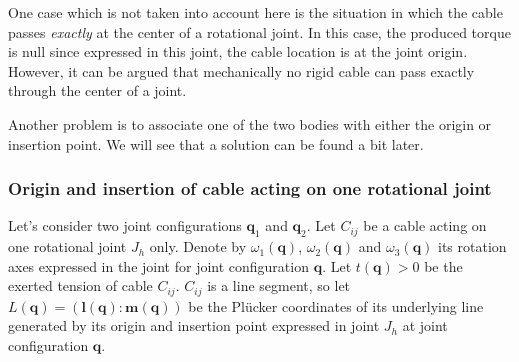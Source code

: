 One case which is not taken into account here is the situation in which the cable passes \emph{exactly} at the center of a rotational joint. In this case, the produced torque is null since expressed in this joint, the cable location is at the joint origin. However, it can be argued that mechanically no rigid cable can pass exactly through the center of a joint.

Another problem is to associate one of the two bodies with either the origin or insertion point. We will see that a solution can be found a bit later.

\subsubsection{Origin and insertion of cable acting on one rotational joint}
Let's consider two joint configurations $\mathbf{q}_1$ and $\mathbf{q}_2$. Let $C_{ij}$ be a cable acting on one rotational joint $J_h$ only. Denote by $\omega_1(\mathbf{q})$, $\omega_2(\mathbf{q})$ and $\omega_3(\mathbf{q})$ its rotation axes expressed in the joint for joint configuration $\mathbf{q}$. Let $t(\mathbf{q}) > 0$ be the exerted tension of cable $C_{ij}$. $C_{ij}$ is a line segment, so let $L(\mathbf{q}) = (\mathbf{l}(\mathbf{q}) : \mathbf{m}(\mathbf{q}))$ be the Plücker coordinates of its underlying line generated by its origin and insertion point expressed in joint $J_h$ at joint configuration $\mathbf{q}$.

